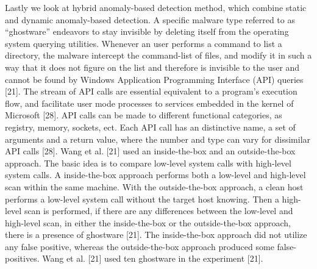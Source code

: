 \documentclass[12pt]{article} %
\begin{document}
Lastly we look at hybrid anomaly-based detection method, which combine static and dynamic anomaly-based detection. A specific malware type referred to as “ghostware” endeavors to stay invisible by deleting itself from the operating system querying utilities. Whenever an user performs a command to list a directory, the malware intercept the command-list of files, and modify it in such a way that it does not figure on the list and therefore is invisible to the user and cannot be found by Windows Application Programming Interface  (API) queries [21]. The  stream of API calls are essential equivalent to a program’s execution flow, and facilitate user mode processes to services embedded in the kernel of Microsoft [28]. API calls can be made to different functional categories, as registry, memory, sockets, ect. Each API call has an distinctive name, a set of arguments and a return value, where the number and type can vary for dissimilar API calls [28]. Wang et al. [21] used an inside-the-box and  an outside-the-box approach. The basic idea is to compare low-level system calls with high-level system calls. A inside-the-box approach performs both a low-level and high-level scan  within the same machine. With the outside-the-box approach, a clean host performs a low-level system call without the target host knowing. Then a high-level scan is performed, if there are any differences between the low-level and high-level scan, in either the inside-the-box or the outside-the-box approach, there is a presence of ghostware [21].  The inside-the-box approach did not utilize any false positive, whereas  the outside-the-box approach produced some false-positives. Wang et al. [21] used ten ghostware in the experiment [21].
\\
\end{document}
